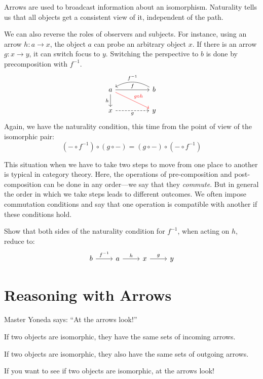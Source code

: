 \documentclass[DaoFP]{subfiles}
\begin{document}
Arrows are used to broadcast information about an isomorphism. Naturality tells us that all objects get a consistent view of it, independent of the path. 

We can also reverse the roles of observers and subjects. For instance, using an arrow $h \colon a \to x$, the object $a$ can probe an arbitrary object $x$. If there is an arrow $g \colon x \to y$, it can switch focus to $y$. Switching the perspective to $b$ is done by precomposition with $f^{-1}$.
\[
 \begin{tikzcd}
 a
 \arrow[rr, "f"]
 \arrow[d, "h"']
 \arrow[rrd, red, "g\circ h"]
 && b
  \arrow[ll, bend right,  "f^{-1}"']
 \\
 x
 \arrow[rr, dashed, "g"']
  && y
 \end{tikzcd}
\]
Again, we have the naturality condition, this time from the point of view of the isomorphic pair:
\[(- \circ f^{-1}) \circ (g \circ -) = (g \circ -) \circ (- \circ f^{-1}) \]

This situation when we have to take two steps to move from one place to another is typical in category theory. Here, the operations of pre-composition and post-composition can be done in any order---we say that they \emph{commute}. But in general the order in which we take steps leads to different outcomes. We often impose commutation conditions and say that one operation is compatible with another if these conditions hold.

\begin{exercise}
Show that both sides of the naturality condition for $f^{-1}$, when acting on $h$, reduce to:
\[
 \begin{tikzcd}
 b \arrow[r, "f^{-1}"] &a \arrow[r, "h"] & x \arrow[r, "g"] & y
\end{tikzcd}
\]

\end{exercise}

\section{Reasoning with Arrows}

Master Yoneda says: ``At the arrows look!''

If two objects are isomorphic, they have the same sets of incoming arrows. 

If two objects are isomorphic, they also have the same sets of outgoing arrows.

If you want to see if two objects are isomorphic, at the arrows look!
\end{document}
